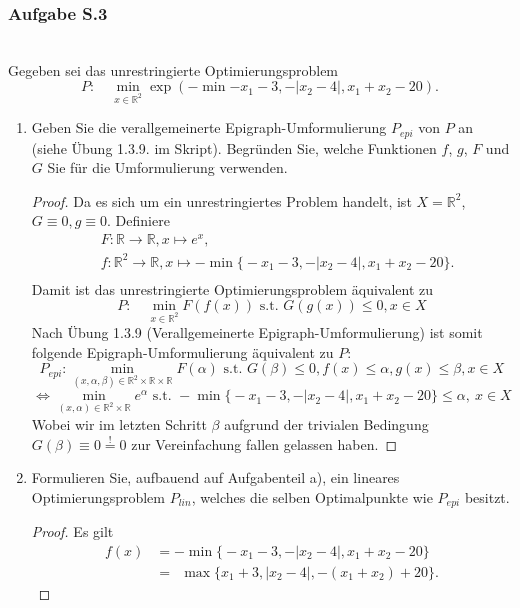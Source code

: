 \documentclass[12pt]{extreport} %
\newcommand{\R}{\mathbb{R}}
\theoremstyle{named}
\theoremstyle{nnamed}
\theoremstyle{itshape}
\theoremstyle{normal}
\begin{document}
\newpage

\subsubsection{Aufgabe S.3} ~\\
Gegeben sei das unrestringierte Optimierungsproblem
$$ P : \quad \min_{x \in \R^2} \exp \left(- \min{- x_1 - 3, -\left|x_2 - 4\right|, x_1 + x_2 - 20} \right).$$
\begin{enumerate}
	\item Geben Sie die verallgemeinerte Epigraph-Umformulierung $P_{epi}$ von $P$ an (siehe Übung 1.3.9. im Skript). Begründen Sie, welche Funktionen $f$, $g$, $F$ und $G$ Sie für die Umformulierung verwenden.
		\begin{proof}
			Da es sich um ein unrestringiertes Problem handelt, ist $X = \R^2$, $G \equiv 0, g \equiv 0$. Definiere
			\begin{align*}
				& F: \R \rightarrow \R, x \mapsto e^{x}, \\
				& f: \R^2 \rightarrow \R, x \mapsto -\min\big\{- x_1 - 3, -\left|x_2 - 4\right|, x_1 + x_2 - 20\big\}. \\
			\end{align*}
			Damit ist das unrestringierte Optimierungsproblem äquivalent zu
			$$ P : \quad \min_{x \in \R^2} F(f(x)) \text{ s.t. } G(g(x)) \leq 0, x \in X $$
			Nach Übung 1.3.9 (Verallgemeinerte Epigraph-Umformulierung) ist somit folgende Epigraph-Umformulierung äquivalent zu $P$:
			$$ P_{epi}: \min_{(x, \alpha, \beta) \in \R^2 \times \R \times \R} F(\alpha) \text{ s.t. } G(\beta) \leq 0, f(x) \leq \alpha, g(x) \leq \beta, x \in X $$
			$$ \iff \min_{(x, \alpha) \in \R^2 \times \R} e^{\alpha} \text{ s.t. } -\min\big\{- x_1 - 3, -\left|x_2 - 4\right|, x_1 + x_2 - 20\big\} \leq \alpha, ~ x \in X $$
			Wobei wir im letzten Schritt $\beta$ aufgrund der trivialen Bedingung $G(\beta) \equiv 0 \overset{!}{=} 0$ zur Vereinfachung fallen gelassen haben.
		\end{proof}
	\item Formulieren Sie, aufbauend auf Aufgabenteil a), ein lineares Optimierungsproblem $P_{lin}$, welches die selben Optimalpunkte wie $P_{epi}$ besitzt.
		\begin{proof}
			Es gilt
			\begin{align*}
				f(x) & = -\min\big\{- x_1 - 3, -\left|x_2 - 4\right|, x_1 + x_2 - 20\big\} \\
				& = ~~ \max\big\{ x_1 + 3, \left|x_2 - 4\right|, -(x_1 + x_2) + 20\big\}.  
			\end{align*} 

\end{proof}
\end{enumerate}
\end{document}

